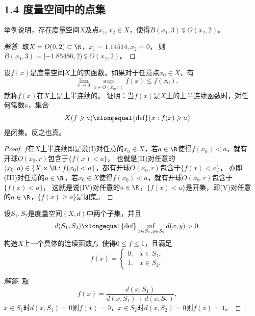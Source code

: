 \subsection{1.4 度量空间中的点集}
\begin{1}
    举例说明，存在度量空间$X$及点$x_1,x_2\in X$，使得$B(x_1,3)\subsetneqq O(x_2,2)$。
\end{1}
\begin{proof}[解答]
    取$X=O(0,2)\subset\R$，$x_1=1.14514,x_2=0$，
    则$B(x_1,3)=[-1.85486,2)\subsetneqq O(x_2,2)$。
\end{proof}

\begin{5}
    设$f(x)$是度量空间$X$上的实函数。如果对于任意点$x_0 \in X$，有
    \[\lim_{r\to0}\sup_{x \in O(x_0,r)}f(x) \leqslant f(x_0),\]
    就称$f(x)$在$X$上是上半连续的。
    证明：当$f(x)$是$X$上的上半连续函数时，对任何常数$a$，集合
    \[X(f \geqslant a)\xlongequal{\text{def}}\{x:f(x) \geqslant a\}\]
    是闭集。反之也真。
\end{5}
\begin{proof}
    $f$在$X$上半连续即是说(I)对任意的$x_0 \in X$，若$a\in\R$使得$f(x_0)<a$，就有开球$O(x_0,r)$包含于$\{f(x)<a\}$，
    也就是(II)对任意的$(x_0,a)\in\{X\times\R:f(x_0)<a\}$，都有开球$O(x_0,r)$包含于$\{f(x)<a\}$，
    亦即(III)对任意的$a\in\R$，若$x_0 \in X$使得$f(x_0)<a$，就有开球$O(x_0,r)$包含于$\{f(x)<a\}$，
    这就是说(IV)对任意的$a\in\R$，$\{f(x)<a\}$是开集，即(V)对任意的$a\in\R$，$\{f(x) \geqslant a\}$是闭集。
\end{proof}

\begin{6}
    设$S_1,S_2$是度量空间$(X,d)$中两个子集，并且
    \[d(S_1,S_2)\xlongequal{\text{def}}\inf_{x \in S_1,y \in S_2}d(x,y)>0.\]
    构造$X$上一个具体的连续函数$f$，使得$0 \leqslant f \leqslant 1$，且满足
    \[f(x)=\begin{cases}0,&x \in S_1,\\1,&x \in S_2.\end{cases}\]
\end{6}
\begin{proof}[解答]
    取\[f(x)=\frac{d(x,S_1)}{d(x,S_1)+d(x,S_2)},\]
    $x \in S_1$时$d(x,S_1)=0$则$f(x)=0$，$x \in S_2$时$d(x,S_2)=0$则$f(x)=1$。
\end{proof}

